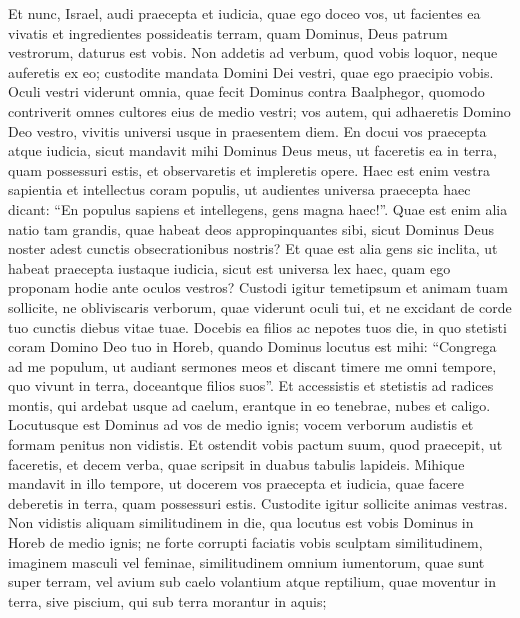 \begin{biblechapter} 
\verse Et nunc, Israel, audi praecepta et iudicia, quae ego doceo vos, ut facientes ea vivatis et ingredientes possideatis terram, quam Dominus, Deus patrum vestrorum, daturus est vobis. 
\verse Non addetis ad verbum, quod vobis loquor, neque auferetis ex eo; custodite mandata Domini Dei vestri, quae ego praecipio vobis. 
\verse Oculi vestri viderunt omnia, quae fecit Dominus contra Baalphegor, quomodo contriverit omnes cultores eius de medio vestri; 
\verse vos autem, qui adhaeretis Domino Deo vestro, vivitis universi usque in praesentem diem. 
\verse En docui vos praecepta atque iudicia, sicut mandavit mihi Dominus Deus meus, ut faceretis ea in terra, quam possessuri estis, 
\verse et observaretis et impleretis opere. Haec est enim vestra sapientia et intellectus coram populis, ut audientes universa praecepta haec dicant: “En populus sapiens et intellegens, gens magna haec!”. 
\verse Quae est enim alia natio tam grandis, quae habeat deos appropinquantes sibi, sicut Dominus Deus noster adest cunctis obsecrationibus nostris? 
\verse Et quae est alia gens sic inclita, ut habeat praecepta iustaque iudicia, sicut est universa lex haec, quam ego proponam hodie ante oculos vestros? 
\verse Custodi igitur temetipsum et animam tuam sollicite, ne obliviscaris verborum, quae viderunt oculi tui, et ne excidant de corde tuo cunctis diebus vitae tuae. Docebis ea filios ac nepotes tuos 
\verse die, in quo stetisti coram Domino Deo tuo in Horeb, quando Dominus locutus est mihi: “Congrega ad me populum, ut audiant sermones meos et discant timere me omni tempore, quo vivunt in terra, doceantque filios suos”. 
\verse Et accessistis et stetistis ad radices montis, qui ardebat usque ad caelum, erantque in eo tenebrae, nubes et caligo. 
\verse Locutusque est Dominus ad vos de medio ignis; vocem verborum audistis et formam penitus non vidistis. 
\verse Et ostendit vobis pactum suum, quod praecepit, ut faceretis, et decem verba, quae scripsit in duabus tabulis lapideis. 
\verse Mihique mandavit in illo tempore, ut docerem vos praecepta et iudicia, quae facere deberetis in terra, quam possessuri estis. 
\verse Custodite igitur sollicite animas vestras. Non vidistis aliquam similitudinem in die, qua locutus est vobis Dominus in Horeb de medio ignis; 
\verse ne forte corrupti faciatis vobis sculptam similitudinem, imaginem masculi vel feminae,  
\verse similitudinem omnium iumentorum, quae sunt super terram, vel avium sub caelo volantium 
\verse atque reptilium, quae moventur in terra, sive piscium, qui sub terra morantur in aquis; 

\end{biblechapter}
